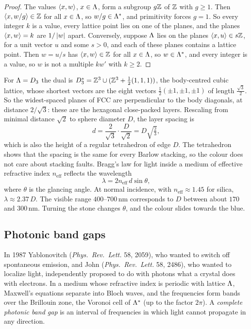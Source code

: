 \begin{proof}
The values $\langle x, w\rangle$, $x\in\Lambda$, form a subgroup $g\mathbb{Z}$ of $\mathbb{Z}$ with $g\ge1$. Then $\langle x, w/g\rangle\in\mathbb{Z}$ for all
$x\in\Lambda$, so $w/g\in\Lambda^*$, and primitivity forces $g=1$. So every integer $k$ is a value, every lattice
point lies on one of the planes, and the planes $\langle x, w\rangle=k$ are $1/\left\lvert w \right\rvert$ apart. Conversely, suppose $\Lambda$ lies on the planes $\langle x, u\rangle\in s\mathbb{Z}$, for a unit vector
$u$ and some $s>0$, and each of these planes contains a lattice point. Then $w=u/s$ has $\langle x, w\rangle\in\mathbb{Z}$ for all
$x\in\Lambda$, so $w\in\Lambda^*$, and every integer is a value, so $w$ is not a multiple $kw'$ with $k\ge2$.
\end{proof}

\begin{example}\label{PHYS:ex:opal}
For $\Lambda=D_3$ the dual is $D_3^*=\mathbb{Z}^3\cup(\mathbb{Z}^3+\frac12(1,1,1))$, the body-centred cubic lattice, whose
shortest vectors are the eight vectors $\frac12(\pm1,\pm1,\pm1)$ of length $\frac{\sqrt3}2$. So the widest-spaced
planes of FCC are perpendicular to the body diagonals, at distance $2/\sqrt3$: these are the hexagonal
close-packed layers. Rescaling from minimal distance $\sqrt2$ to sphere diameter $D$, the layer spacing is
\[
  d=\frac{2}{\sqrt3}\cdot\frac{D}{\sqrt2}=D\sqrt{\tfrac23},
\]
which is also the height of a regular tetrahedron of edge $D$. The tetrahedron shows that the spacing
is the same for every Barlow stacking, so the colour does not care about stacking faults. Bragg's law for
light inside a medium of effective refractive index $n_{\mathrm{eff}}$ reflects the wavelength
\[
  \lambda=2n_{\mathrm{eff}}\,d\sin\theta,
\]
where $\theta$ is the glancing angle. At normal incidence, with $n_{\mathrm{eff}}\approx1.45$ for silica, $\lambda\approx2.37\,D$.
The visible range $400$--$700$\,nm corresponds to $D$ between about $170$ and $300$\,nm. Turning the stone
changes $\theta$, and the colour slides towards the blue.
\end{example}


\subsection*{Photonic band gaps}
In 1987 Yablonovitch (\emph{Phys.\ Rev.\ Lett.} 58, 2059), who wanted to switch off spontaneous emission, and
John (\emph{Phys.\ Rev.\ Lett.} 58, 2486), who wanted to localize light, independently proposed to do with
photons what a crystal does with electrons. In a medium whose refractive index is periodic with lattice
$\Lambda$, Maxwell's equations separate into Bloch waves, and the frequencies form bands over the Brillouin
zone, the Voronoi cell of $\Lambda^*$ (up to the factor $2\pi$). A \emph{complete photonic band gap} is an
interval of frequencies in which light cannot propagate in any direction.


